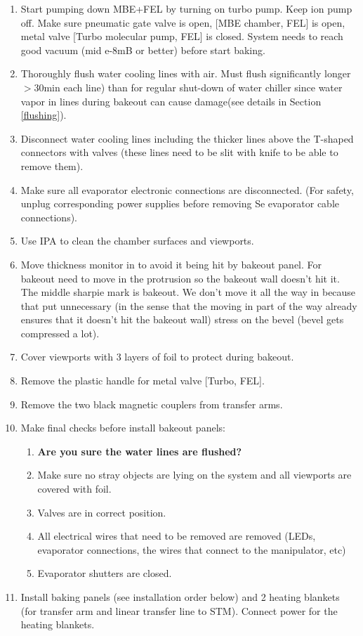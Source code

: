 \begin{enumerate}
\begin{enumerate}
\end{enumerate}
\item	Start pumping down MBE+FEL by turning on turbo pump. Keep ion pump off. Make sure pneumatic gate valve is open, [MBE chamber, FEL] is open, metal valve [Turbo molecular pump, FEL] is closed. System needs to reach good vacuum (mid e-8mB or better) before start baking. 
\item	Thoroughly flush water cooling lines with air. Must flush significantly longer $>30$min each line) than for regular shut-down of water chiller since water vapor in lines during bakeout can cause damage(see details in Section \ref{flushing}).
\item	Disconnect water cooling lines including the thicker lines above the T-shaped connectors with valves (these lines need to be slit with knife to be able to remove them). 
\item	Make sure all evaporator electronic connections are disconnected. (For safety, unplug corresponding power supplies before removing Se evaporator cable connections). 
\item	Use IPA to clean the chamber surfaces and viewports.
\item	Move thickness monitor in to avoid it being hit by bakeout panel. For bakeout need to move in the protrusion so the bakeout wall doesn’t hit it. The middle sharpie mark is bakeout. We don’t move it all the way in because that put unnecessary (in the sense that the moving in part of the way already ensures that it doesn’t hit the bakeout wall) stress on the bevel (bevel gets compressed a lot).
\item	Cover viewports with 3 layers of foil to protect during bakeout.
\item	Remove the plastic handle for metal valve [Turbo, FEL].
\item   Remove the two black magnetic couplers from transfer arms. 
\item	Make final checks before install bakeout panels: 
\begin{enumerate}
	\item \textbf{Are you sure the water lines are flushed?}
	\item Make sure no stray objects are lying on the system and all viewports are covered with foil.
	\item Valves are in correct position.
	\item All electrical wires that need to be removed are removed (LEDs, evaporator connections, the wires that connect to the manipulator, etc)
	\item Evaporator shutters are closed.
\end{enumerate}
\item	Install baking panels (see installation order below) and 2 heating blankets (for transfer arm and linear transfer line to STM). Connect power for the heating blankets.

\end{enumerate}
